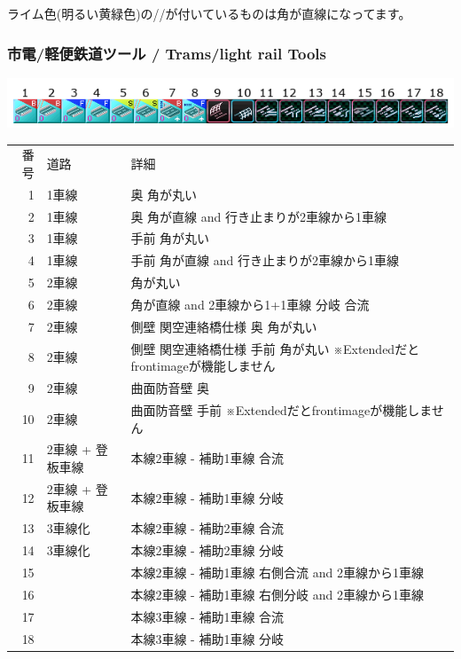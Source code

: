 \documentclass{jarticle}
\begin{document}
\vspace{5pt}
ライム色(明るい黄緑色)の//が付いているものは角が直線になってます。

\newpage

\subsubsection{市電/軽便鉄道ツール / Trams/light rail Tools}
\begin{flushleft}
  \includegraphics{picture/menu-2-1.png}
\end{flushleft}
\begin{tabular}{rll}
  番号 & 道路 & 詳細 \\
  1 & 1車線 & 奥 角が丸い \\
  2 & 1車線 & 奥 角が直線 and 行き止まりが2車線から1車線 \\
  3 & 1車線 & 手前 角が丸い \\
  4 & 1車線 & 手前 角が直線 and 行き止まりが2車線から1車線 \\
  5 & 2車線 & 角が丸い \\
  6 & 2車線 & 角が直線 and 2車線から1+1車線 分岐 合流 \\
  7 & 2車線 & 側壁 関空連絡橋仕様 奥 角が丸い \\
  8 & 2車線 & 側壁 関空連絡橋仕様 手前 角が丸い ※Extendedだとfrontimageが機能しません\\
  9 & 2車線 & 曲面防音壁 奥\\
  10 & 2車線 & 曲面防音壁 手前 ※Extendedだとfrontimageが機能しません\\
  11 & 2車線 + 登板車線 & 本線2車線 - 補助1車線 合流\\
  12 & 2車線 + 登板車線 & 本線2車線 - 補助1車線 分岐\\
  13 & 3車線化 & 本線2車線 - 補助2車線 合流\\
  14 & 3車線化 & 本線2車線 - 補助2車線 分岐\\
  15 & & 本線2車線 - 補助1車線 右側合流 and 2車線から1車線\\
  16 & & 本線2車線 - 補助1車線 右側分岐 and 2車線から1車線\\
  17 & & 本線3車線 - 補助1車線 合流\\
  18 & & 本線3車線 - 補助1車線 分岐\\
\end{tabular}
\end{document}
